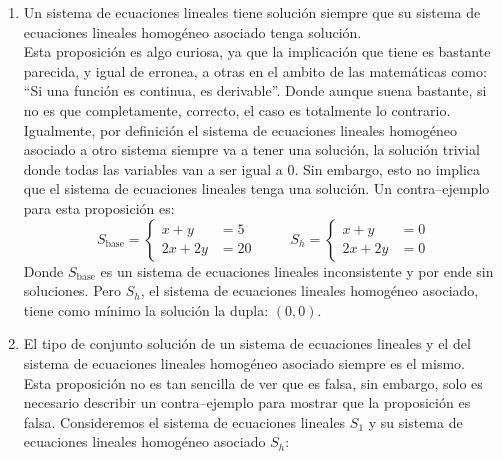 \documentclass{article}
\begin{document}
\begin{enumerate}
\begin{enumerate}[label=\listAlph]
			\item Un sistema de ecuaciones lineales tiene solución siempre que su sistema de ecuaciones lineales homogéneo asociado tenga solución. \\
                Esta proposición es algo curiosa, ya que la implicación que tiene es bastante parecida, y igual de erronea, a otras en el ambito de las matemáticas como:
                \enquote{Si una función es continua, es derivable}. Donde aunque suena bastante, si no es que completamente, correcto, el caso es totalmente lo contrario.
                Igualmente, por definición el sistema de ecuaciones lineales homogéneo asociado a otro sistema siempre va a tener una solución, la solución trivial donde todas
                las variables van a ser igual a 0. Sin embargo, esto no implica que el sistema de ecuaciones lineales tenga una solución. Un contra--ejemplo para esta proposición es:
                \[
                    S_{\text{base}} =
                    \left\{
                        \begin{aligned}
                            x + y &= 5 \\
                            2x + 2y &= 20 
                        \end{aligned}
                    \right.
                    \hspace{1cm}
                    S_{h} = 
                    \left\{
                        \begin{aligned}
                            x + y &= 0 \\
                            2x + 2y &= 0 
                        \end{aligned}
                    \right.
                \]
                Donde \(S_{\text{base}}\) es un sistema de ecuaciones lineales inconsistente y por ende sin soluciones.
                Pero \(S_h\), el sistema de ecuaciones lineales homogéneo asociado, tiene como mínimo la solución la dupla: \(\left(0, 0\right)\).
			\item El tipo de conjunto solución de un sistema de ecuaciones lineales y el del sistema de ecuaciones lineales homogéneo asociado siempre es el mismo. \\
                Esta proposición no es tan sencilla de ver que es falsa, sin embargo, solo es necesario describir un contra--ejemplo para mostrar que la proposición es falsa.
                Consideremos el sistema de ecuaciones lineales \(S_1\) y su sistema de ecuaciones lineales homogéneo asociado \(S_h\):
                \[
\]
\end{enumerate}
\end{enumerate}
\end{document}
